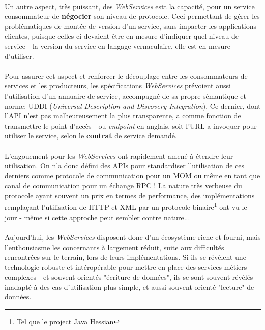 {  \paragraph{} Un autre aspect, très puissant, des \textit{WebServices} estt la capacité, pour un
  service consommateur de \textbf{négocier} son niveau de protocole. Ceci permettant de gérer les
  problématiques de montée de version d'un service, sans impacter les applications clientes, puisque
  celles-ci devaient être en mesure d'indiquer quel niveau de service - la version du service en
  langage vernaculaire, elle est en mesure d'utiliser.

  \paragraph{} Pour assurer cet aspect et renforcer le découplage entre les consommateurs de
  services et les producteurs, les spécifications \textit{WebServices} prévoient aussi l'utilisation
  d'un annuaire de service, accompagné de sa propre sémantique et norme: UDDI (\textit{Universal
  Description and Discovery Integration}). Ce dernier, dont l'API n'est pas malheureusement la plus
  transparente, a comme fonction de transmettre le point d'accès - ou \textit{endpoint} en anglais,
  soit l'URL a invoquer pour utiliser le service, selon le \textbf{contrat} de service demandé.

  \paragraph{} L'engouement pour les \textit{WebServices} ont rapidement amené à étendre leur
  utilisation. On n'a donc défini des APIs pour standardiser l'utilisation de ces derniers comme
  protocole de communication pour un MOM ou même en tant que canal de communication pour un échange
  RPC ! La nature très verbeuse du protocole ayant souvent un prix en termes de performance, des
  implémentations remplaçant l'utilisation de HTTP et XML par un protocole binaire\footnote{Tel que
  le project Java Hessian} ont vu le jour - même si cette approche peut sembler contre nature...

  \paragraph{} Aujourd'hui, les \textit{WebServices} disposent donc d'un écosystème riche et fourni,
  mais l'enthousiasme les concernants à largement réduit, suite aux difficultés rencontrées sur le
  terrain, lors de leurs implémentations. Si ils se révèlent une technologie robuste et
  intéropérable pour mettre en place des services métiers complexes - et souvent orientés "écriture
  de données", ils se sont souvent révélés inadapté à des cas d'utilisation plus simple, et aussi
  souvent orienté "lecture" de données.

}
